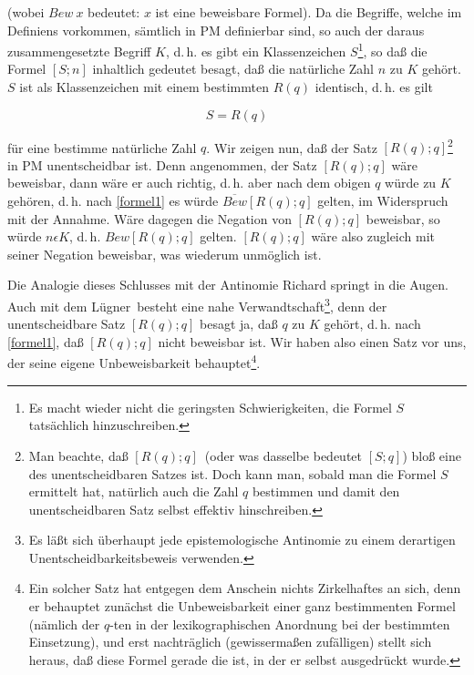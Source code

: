 \documentclass[draft]{scrartcl}
\begin{document}
(wobei $Bew\ x$ bedeutet: $x$ ist eine beweisbare Formel).
Da die Begriffe, welche im Definiens vorkommen, sämtlich
in PM definierbar sind, so auch der daraus zusammengesetzte
Begriff $K$, d.\,h. es gibt ein Klassenzeichen
$S$\footnote{Es macht wieder nicht die geringsten Schwierigkeiten, die Formel $S$ tatsächlich hinzuschreiben.},
so daß die Formel $\left[S; n\right]$ inhaltlich gedeutet besagt,
daß die natürliche Zahl $n$ zu $K$ gehört. $S$ ist als
Klassenzeichen mit einem bestimmten $R\left(q\right)$ identisch,
d.\,h. es gilt

$$ S = R\left(q\right) $$%

\noindent für eine bestimme natürliche Zahl $q$. Wir zeigen nun, daß
der Satz $\left[R\left(q\right); q\right]$\footnote{Man beachte, daß
\glqq$\left[R\left(q\right); q\right]$\grqq\ (oder was dasselbe bedeutet
\glqq$\left[S; q\right]$\grqq) bloß eine 
des unentscheidbaren Satzes ist. Doch kann man, sobald man die Formel
$S$ ermittelt hat, natürlich auch die Zahl $q$ bestimmen und damit
den unentscheidbaren Satz selbst effektiv hinschreiben.}
in PM unentscheidbar ist. Denn angenommen, der Satz
$\left[R\left(q\right); q\right]$ wäre beweisbar, dann wäre er auch richtig,
d.\,h. aber nach dem obigen $q$ würde zu $K$ gehören,
d.\,h. nach \ref{formel1} es würde
$\overline{Bew}\left[R\left(q\right); q\right]$ gelten, im Widerspruch mit der
Annahme. Wäre dagegen die Negation von
$\left[R\left(q\right); q\right]$ beweisbar, so würde $n \epsilon K$,
d.\,h. $Bew\left[R\left(q\right); q\right]$ gelten. $\left[R\left(q\right); q\right]$ wäre also
zugleich mit seiner Negation beweisbar, was wiederum
unmöglich ist.

Die Analogie dieses Schlusses mit der Antinomie Richard
springt in die Augen. Auch mit dem
\glqq Lügner\grqq\ besteht eine nahe
Verwandtschaft\footnote{Es läßt sich überhaupt jede epistemologische
Antinomie zu einem derartigen Unentscheidbarkeitsbeweis verwenden.},
denn der unentscheidbare Satz $\left[R\left(q\right); q\right]$ besagt ja,
daß $q$ zu $K$ gehört, d.\,h. nach \ref{formel1},
daß $\left[R\left(q\right); q\right]$ nicht beweisbar ist. Wir haben
also einen Satz vor uns, der seine eigene
Unbeweisbarkeit behauptet\footnote{\label{zufaellig}Ein solcher Satz
hat entgegen dem Anschein nichts Zirkelhaftes an sich, denn
er behauptet zunächst die Unbeweisbarkeit einer ganz bestimmenten
Formel (nämlich der $q$-ten in der lexikographischen Anordnung
bei der bestimmten Einsetzung), und erst nachträglich (gewissermaßen
zufälligen) stellt sich heraus, daß diese Formel gerade
die ist, in der er selbst ausgedrückt wurde.}.
\end{document}
